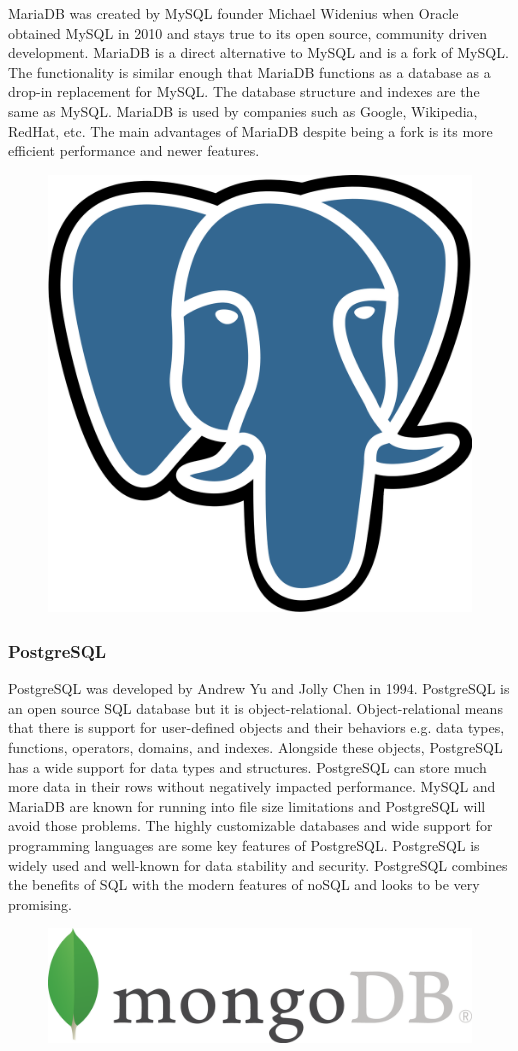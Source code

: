 \documentclass[12pt]{article}
\begin{document}
MariaDB was created by MySQL founder Michael Widenius when Oracle obtained MySQL in 2010 and stays true to its open source, community driven development.  MariaDB is a direct alternative to MySQL and is a fork of MySQL.\cite{mariadb}  The functionality is similar enough that MariaDB functions as a database as a drop-in replacement for MySQL.  The database structure and indexes are the same as MySQL.  MariaDB is used by companies such as Google, Wikipedia, RedHat, etc.  The main advantages of MariaDB despite being a fork is its more efficient performance and newer features.

\begin{figure}[h]
	\centering
	\includegraphics[width=0.251\linewidth]{postgresql}
\end{figure}

\subsubsection{PostgreSQL}

PostgreSQL was developed by Andrew Yu and Jolly Chen in 1994.\cite{postgres} PostgreSQL is an open source SQL database but it is object-relational.  Object-relational means that there is support for user-defined objects and their behaviors e.g. data types, functions, operators, domains, and indexes.  Alongside these objects, PostgreSQL has a wide support for data types and structures.  PostgreSQL can store much more data in their rows without negatively impacted performance.  MySQL and MariaDB are known for running into file size limitations and PostgreSQL will avoid those problems.  The highly customizable databases and wide support for programming languages are some key features of PostgreSQL.  PostgreSQL is widely used and well-known for data stability and security.  PostgreSQL combines the benefits of SQL with the modern features of noSQL and looks to be very promising.

\begin{figure}[h]
	\centering
	\includegraphics[width=0.251\linewidth]{mongodb}
\end{figure}
\end{document}
